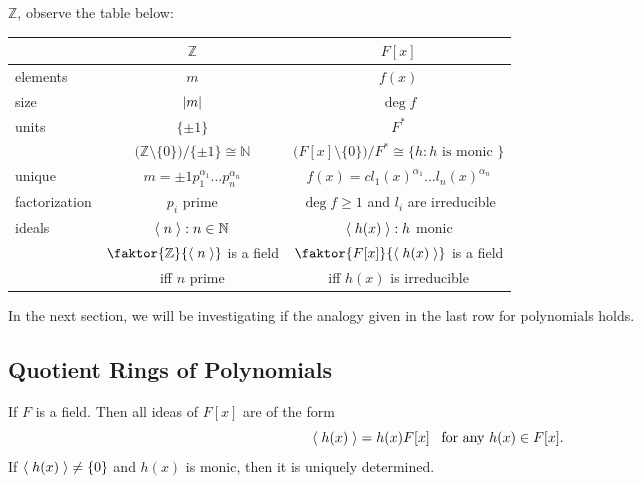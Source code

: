  $\mathbb{Z}$, observe the table below:

{\renewcommand{\arraystretch}{1.5}
\begin{tabular}{l | c | c}
                & $\mathbb{Z}$                                                                & $F[x]$ \\
  \hline
  elements      & $m$                                                                         & $f(x)$ \\
  \hline
  size          & $\left|m\right|$                                                                   & $\deg f$ \\
  \hline
  units         & $\{ \pm 1 \}$                                                               & $F^*$ \\
                & $\Big( \mathbb{Z} \setminus \{0\} \Big) \Big/ \{ \pm 1 \} \cong \mathbb{N}$ & $\Big( F[x] \setminus \{0\} \Big) \Big/ F^* \cong \{ h : h \text{ is monic } \}$ \\
  \hline
  unique        & $m = \pm 1 p_1^{\alpha_1} \hdots p_n^{\alpha_n}$                            & $f(x) = c l_1(x)^{\alpha_1} \hdots l_n(x)^{\alpha_n} $ \\
  factorization & $p_i$ prime                                                                 & $\deg f \geq 1$ and $l_i$ are irreducible \\
  \hline
  ideals        & $\langle \; n \; \rangle : n \in \mathbb{N}$                                                & $\langle \; h(x) \; \rangle : h$ monic \\
                & $\faktor{\mathbb{Z}}{\lra{n}}$ is a field                                   & $\faktor{F[x]}{\lra{h(x)}}$ is a field \\
                & iff $n$ prime                                                               & iff $h(x)$ is irreducible
\end{tabular}}

In the next section, we will be investigating if the analogy given in the last row for polynomials holds.


\subsection{Quotient Rings of Polynomials}%
\label{sub:quotient_rings_of_polynomials}

\begin{propo}
\label{propo:ideals_of_f_x_are_principal_ideals}
If $F$ is a field. Then all ideas of $F[x]$ are of the form
\begin{equation*}
  \langle \; h(x) \; \rangle = h(x) F[x] \enspace \text{ for any } h(x) \in F[x].
\end{equation*}
If $\langle \; h(x) \; \rangle \neq \{0\}$ and $h(x)$ is monic, then it is uniquely determined.
\end{propo}

